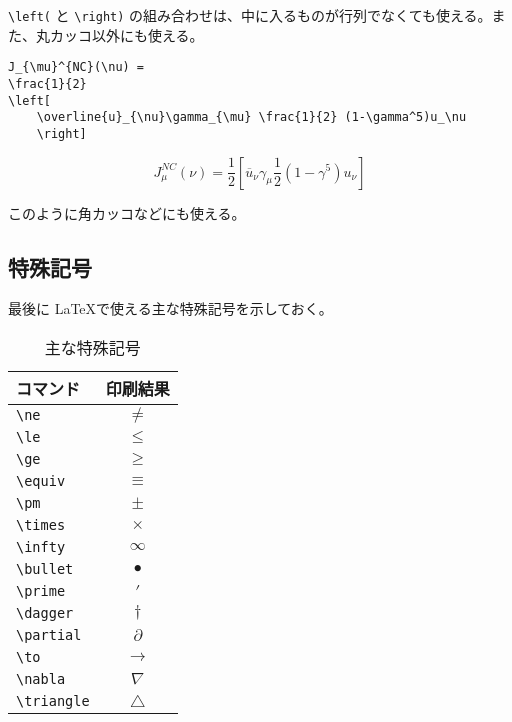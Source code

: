 \verb|\left(| と \verb|\right)| の組み合わせは、中に入るものが行列でなくても使える。また、丸カッコ以外にも使える。
\begin{reidai}
    \begin{verbatim}
J_{\mu}^{NC}(\nu) =
\frac{1}{2}
\left[
    \overline{u}_{\nu}\gamma_{\mu} \frac{1}{2} (1-\gamma^5)u_\nu
    \right]
\end{verbatim}
\end{reidai}
\vspace*{-1.5em}
\begin{kekka}
    \begin{equation}
        J_{\mu}^{NC}(\nu) =
        \frac{1}{2}
        \left[
            \overline{u}_{\nu}\gamma_{\mu} \frac{1}{2} (1-\gamma^5)u_\nu
            \right]
    \end{equation}
    \vspace{0pt}
\end{kekka} \noindent
このように角カッコなどにも使える。

\subsection{特殊記号}
\label{sec:latex:symbol}

最後に \LaTeX で使える主な特殊記号を示しておく。
\begin{table}[H]
    \centering
    \caption{主な特殊記号}
    \label{tab:symbol}
    \begin{tabular}{|lc|}
        \hline
        コマンド                 & 印刷結果      \\
        \hline \hline
        \verb|\ne|  & \(\ne\)       \\
        \verb|\le|  & \(\le\)       \\
        \verb|\ge|  & \(\ge\)       \\
        \verb|\equiv|  & \(\equiv\)    \\
        \verb|\pm|  & \(\pm\)       \\
        \verb|\times|  & \(\times\)    \\
        \verb|\infty|  & \(\infty\)    \\
        \verb|\bullet|  & \(\bullet\)   \\
        \verb|\prime| & \(\prime\)    \\
        \verb|\dagger| & \(\dagger\)   \\
        \verb|\partial| & \(\partial\)  \\
        \verb|\to| & \(\to\)       \\
        \verb|\nabla| & \(\nabla\)    \\
        \verb|\triangle| & \(\triangle\) \\
        \hline
    \end{tabular}
\end{table}

